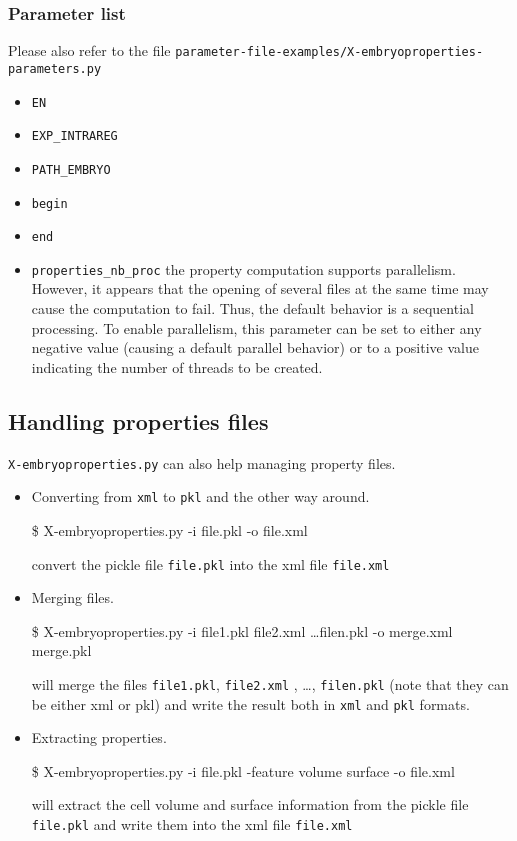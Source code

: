 \subsubsection{Parameter list}

Please also refer to the file
\texttt{parameter-file-examples/X-embryoproperties-parameters.py}

\begin{itemize}
\itemsep -1ex
\item \texttt{EN}
\item \texttt{EXP\_INTRAREG}
\item \texttt{PATH\_EMBRYO}
\item \texttt{begin}
\item \texttt{end}
\item \texttt{properties\_nb\_proc} the property computation supports parallelism. However, it appears that the opening of several files at the same time may cause the computation to fail. Thus, the default behavior is a sequential processing. To enable parallelism, this parameter can be set to either any negative value (causing a default parallel behavior) or to a positive value indicating the number of threads to be created.
\end{itemize}

\subsection{Handling properties files}

\texttt{X-embryoproperties.py} can also help managing property files.

\begin{itemize}
  \itemsep -1ex
\item Converting from \texttt{xml} to \texttt{pkl} and  the other way around.
  \begin{code}{0.8}
  \$ X-embryoproperties.py -i file.pkl -o file.xml
  \end{code}
  convert the pickle file \texttt{file.pkl} into the xml file  \texttt{file.xml}
\item Merging files.
  \begin{code}{0.8}
  \$ X-embryoproperties.py -i file1.pkl file2.xml \ldots filen.pkl -o merge.xml merge.pkl
  \end{code}
  will merge the files  \texttt{file1.pkl},  \texttt{file2.xml} , \ldots, \texttt{filen.pkl} (note that they can be either xml or pkl) and write the result both in \texttt{xml} and \texttt{pkl} formats.
\item Extracting properties.
  \begin{code}{0.8}
  \$ X-embryoproperties.py -i file.pkl -feature volume surface -o file.xml
  \end{code}
  will extract the cell volume and surface information from the  pickle file \texttt{file.pkl} and write them into the xml file  \texttt{file.xml}
\end{itemize}